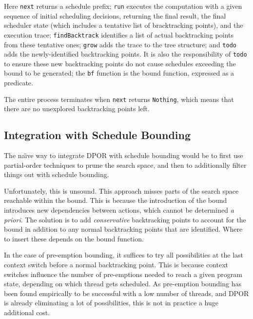 
Here \verb|next| returns a schedule prefix; \verb|run| executes the
computation with a given sequence of initial scheduling decisions,
returning the final result, the final scheduler state (which includes
a tentative list of bracktracking points), and the execution trace;
\verb|findBacktrack| identifies a list of actual backtracking points
from these tentative ones; \verb|grow| adds the trace to the tree
structure; and \verb|todo| adds the newly-identified backtracking
points. It is also the responsibility of \verb|todo| to ensure these
new backtracking points do not cause schedules exceeding the bound to
be generated; the \verb|bf| function is the bound function, expressed
as a predicate.

The entire process terminates when \verb|next| returns \verb|Nothing|,
which means that there are no unexplored backtracking points left.

\subsection{Integration with Schedule Bounding}
\label{sec:sct-por-bounding}

The na\"{\i}ve way to integrate DPOR with schedule bounding would be
to first use partial-order techniques to prune the search space, and
then to additionally filter things out with schedule bounding.

Unfortunately, this is unsound. This approach misses parts of the
search space reachable within the bound. This is because the
introduction of the bound introduces new dependencies between actions,
which cannot be determined \emph{a priori}. The solution is to add
\emph{conservative} backtracking points to account for the bound in
addition to any normal backtracking points that are identified. Where
to insert these depends on the bound function.

In the case of pre-emption bounding, it suffices to try all
possibilities at the last context switch before a normal backtracking
point. This is because context switches influence the number of
pre-emptions needed to reach a given program state, depending on which
thread gets scheduled. As pre-emption bounding has been found
empirically to be successful with a low number of threads, and DPOR is
already eliminating a lot of possibilities, this is not in practice a
huge additional cost.

